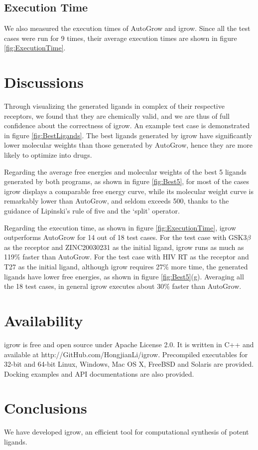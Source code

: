 \documentclass[10pt, conference, compsocconf]{../IEEEtran}
\begin{document}
\subsection{Execution Time}

We also measured the execution times of AutoGrow and igrow. Since all the test cases were run for 9 times, their average execution times are shown in figure \ref{fig:ExecutionTime}.

\section{Discussions}

Through visualizing the generated ligands in complex of their respective receptors, we found that they are chemically valid, and we are thus of full confidence about the correctness of igrow. An example test case is demonstrated in figure \ref {fig:BestLigands}.
The best ligands generated by igrow have significantly lower molecular weights than those generated by AutoGrow, hence they are more likely to optimize into drugs.

Regarding the average free energies and molecular weights of the best 5 ligands generated by both programs, as shown in figure \ref{fig:Best5}, for most of the cases igrow displays a comparable free energy curve, while its molecular weight curve is remarkably lower than AutoGrow, and seldom exceeds 500, thanks to the guidance of Lipinski's rule of five and the `split' operator.

Regarding the execution time, as shown in figure \ref{fig:ExecutionTime}, igrow outperforms AutoGrow for 14 out of 18 test cases.
For the test case with GSK3$\beta$ as the receptor and ZINC20030231 as the initial ligand, igrow runs as much as 119\% faster than AutoGrow.
For the test case with HIV RT as the receptor and T27 as the initial ligand, although igrow requires 27\% more time, the generated ligands have lower free energies, as shown in figure \ref{fig:Best5}(g).
Averaging all the 18 test cases, in general igrow executes about 30\% faster than AutoGrow.

\section{Availability}

igrow is free and open source under Apache License 2.0. It is written in C++ and available at http://GitHub.com/HongjianLi/igrow. Precompiled executables for 32-bit and 64-bit Linux, Windows, Mac OS X, FreeBSD and Solaris are provided. Docking examples and API documentations are also provided.

\section{Conclusions}

We have developed igrow, an efficient tool for computational synthesis of potent ligands.



\end{document}
